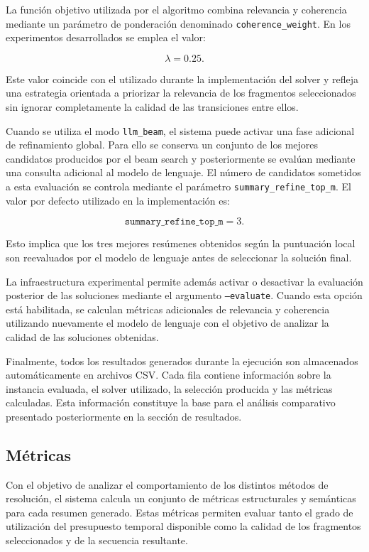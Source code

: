 \documentclass[12pt,a4paper]{article}
\begin{document}
La función objetivo utilizada por el algoritmo combina relevancia y coherencia mediante un parámetro de ponderación denominado \texttt{coherence\_weight}. En los experimentos desarrollados se emplea el valor:

\[
\lambda = 0.25.
\]

Este valor coincide con el utilizado durante la implementación del solver y refleja una estrategia orientada a priorizar la relevancia de los fragmentos seleccionados sin ignorar completamente la calidad de las transiciones entre ellos.

Cuando se utiliza el modo \texttt{llm\_beam}, el sistema puede activar una fase adicional de refinamiento global. Para ello se conserva un conjunto de los mejores candidatos producidos por el beam search y posteriormente se evalúan mediante una consulta adicional al modelo de lenguaje. El número de candidatos sometidos a esta evaluación se controla mediante el parámetro \texttt{summary\_refine\_top\_m}. El valor por defecto utilizado en la implementación es:

\[
\texttt{summary\_refine\_top\_m}=3.
\]

Esto implica que los tres mejores resúmenes obtenidos según la puntuación local son reevaluados por el modelo de lenguaje antes de seleccionar la solución final.

La infraestructura experimental permite además activar o desactivar la evaluación posterior de las soluciones mediante el argumento \texttt{--evaluate}. Cuando esta opción está habilitada, se calculan métricas adicionales de relevancia y coherencia utilizando nuevamente el modelo de lenguaje con el objetivo de analizar la calidad de las soluciones obtenidas.

Finalmente, todos los resultados generados durante la ejecución son almacenados automáticamente en archivos CSV. Cada fila contiene información sobre la instancia evaluada, el solver utilizado, la selección producida y las métricas calculadas. Esta información constituye la base para el análisis comparativo presentado posteriormente en la sección de resultados.

\subsection{Métricas}

Con el objetivo de analizar el comportamiento de los distintos métodos de resolución, el sistema calcula un conjunto de métricas estructurales y semánticas para cada resumen generado. Estas métricas permiten evaluar tanto el grado de utilización del presupuesto temporal disponible como la calidad de los fragmentos seleccionados y de la secuencia resultante.
\end{document}
